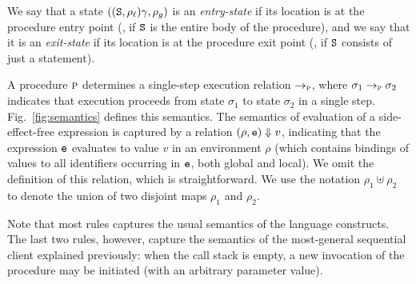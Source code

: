 We say that a state $((\texttt{S},\rho_\ell)\gamma,\rho_g)$ is an \emph{entry-state} if its location is at
the procedure entry point (\ie, if $\texttt{S}$ is the entire body of the procedure),
and we say that it is an \emph{exit-state} if its location is at the procedure exit point
(\ie, if $\texttt{S}$ consists of just a  statement).

A procedure $\textsc{p}$ determines a single-step execution relation $\rightarrow_{\textsc{p}}$,
where $\sigma_1 \rightarrow_{\textsc{p}} \sigma_2$ indicates
that execution proceeds from state $\sigma_1$ to state $\sigma_2$ in a single step.
Fig.~\ref{fig:semantics} defines this semantics.
The semantics of evaluation of a side-effect-free expression is captured
by a relation $({\rho},{\texttt{e}}) \Downarrow {v}$, indicating that the expression
$\texttt{e}$ evaluates to value $v$ in an environment $\rho$ (which contains bindings
of values to all identifiers occurring in $\texttt{e}$, both global and local).
We omit the definition of this relation, which is straightforward.
We use the notation $\rho_1 \uplus \rho_2$ to denote the union of two disjoint maps
$\rho_1$ and $\rho_2$.


Note that most rules captures the usual semantics of the language constructs.
The last two rules, however, capture the semantics of the most-general sequential
client explained previously: when the call stack is empty, a new invocation of
the procedure may be initiated (with an arbitrary parameter value).


